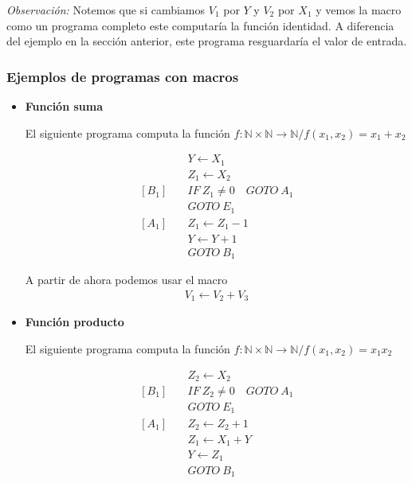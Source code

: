 \begin{itemize}
        \bigskip
        \textit{Observación:}
        Notemos que si cambiamos $V_1$ por $Y$ y $V_2$ por $X_1$ y vemos la
        macro como un programa completo este computaría la función identidad.
        A diferencia del ejemplo en la sección anterior, este programa 
        resguardaría el valor de entrada.
\end{itemize}

\subsubsection{Ejemplos de programas con macros}

\begin{itemize}
    \item \textbf{Función suma} \label{ej:funcion-suma}

        El siguiente programa computa la función 
        $f: \mathbb{N} \times \mathbb{N} \to \mathbb{N}/f(x_1, x_2) = x_1+x_2$

        \begin{align*}
                        &Y \gets X_1 \\
                        &Z_1 \gets X_2 \\
            [B_1] \quad &IF ~ Z_1 \neq 0 \quad GOTO ~ A_1 \\
                        &GOTO ~ E_1 \\
            [A_1] \quad &Z_1 \gets Z_1 - 1 \\
                        &Y \gets Y + 1 \\
                        &GOTO ~ B_1
        \end{align*}

        A partir de ahora podemos usar el macro
        \begin{gather*}
            V_1 \gets V_2 + V_3
        \end{gather*}

    \item \textbf{Función producto} \label{ej:funcion-producto}

        El siguiente programa computa la función 
        $f: \mathbb{N} \times \mathbb{N} \to \mathbb{N}/f(x_1, x_2) = x_1 x_2$

        \begin{align*}
                        &Z_2 \gets X_2 \\
            [B_1] \quad &IF ~ Z_2 \neq 0 \quad GOTO ~ A_1 \\
                        &GOTO ~ E_1 \\
            [A_1] \quad &Z_2 \gets Z_2 + 1 \\
                        &Z_1 \gets X_1 + Y \\
                        &Y \gets Z_1 \\
                        &GOTO ~ B_1
        \end{align*}


\end{itemize}
